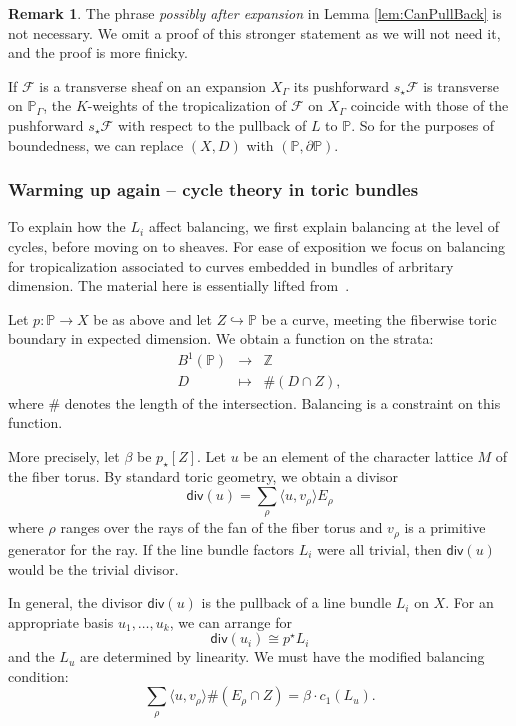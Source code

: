 \documentclass[11pt]{amsart}
\theoremstyle{definition}
\theoremstyle{definition}
\newtheorem{remark}[theorem]{Remark}
\begin{document}
\begin{remark}
    The phrase \textit{possibly after expansion} in Lemma \ref{lem:CanPullBack} is not necessary. We omit a proof of this stronger statement as we will not need it, and the proof is more finicky.
\end{remark}

If $\mathcal F$ is a transverse sheaf on an expansion $X_\Gamma$ its pushforward $s_\star\mathcal F$ is transverse on $\mathbb P_\Gamma$, the $K$-weights of the tropicalization of $\mathcal F$ on $X_\Gamma$ coincide with those of the pushforward $s_\star\mathcal F$ with respect to the pullback of $L$ to $\mathbb P$. So for the purposes of boundedness, we can replace $(X,D)$ with $(\mathbb P,\partial \mathbb P)$.

\subsubsection{Warming up again -- cycle theory in toric bundles} To explain how the $L_i$ affect balancing, we first explain balancing at the level of cycles, before moving on to sheaves. For ease of exposition we focus on balancing for tropicalization associated to curves embedded in bundles of arbritary dimension. The material here is essentially lifted from~\cite{CMN,Dod24}. 

Let $p\colon \mathbb P\to X$ be as above and let $Z\hookrightarrow \mathbb P$ be a curve, meeting the fiberwise toric boundary in expected dimension. We obtain a function on the strata:
\begin{eqnarray*}
B^1(\mathbb P)&\to&\mathbb Z\\
D&\mapsto& \#(D\cap Z),
\end{eqnarray*}
where $\#$ denotes the length of the intersection. Balancing is a constraint on this function. 

More precisely, let $\beta$ be $p_\star[Z]$. Let $u$ be an element of the character lattice $M$ of the fiber torus. By standard toric geometry, we obtain a divisor
\[
\mathsf{div}(u) = \sum_{\rho} \langle u,v_\rho\rangle E_\rho
\]
where $\rho$ ranges over the rays of the fan of the fiber torus and $v_\rho$ is a primitive generator for the ray. If the line bundle factors $L_i$ were all trivial, then $\mathsf{div}(u)$ would be the trivial divisor. 

In general, the divisor $\mathsf{div}(u)$ is the pullback of a line bundle $L_i$ on $X$. For an appropriate basis $u_1,\ldots,u_k$, we can arrange for
\[
\mathsf{div}(u_i) \cong p^\star L_i
\]
and the $L_u$ are determined by linearity. We must have the modified balancing condition:
\[
\sum_{\rho} \langle u,v_\rho\rangle \#(E_\rho\cap Z) = \beta\cdot c_1(L_u). 
\]
\end{document}
